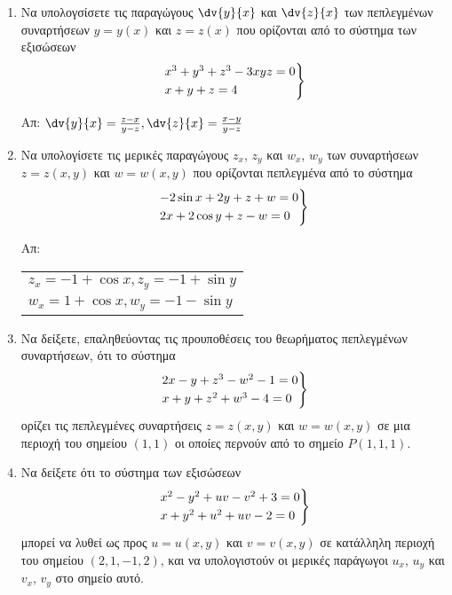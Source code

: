 \begin{enumerate}


    \item Να υπολογσίσετε τις παραγώγους $ \dv{y}{x} $ και $ \dv{z}{x}$ των πεπλεγμένων 
        συναρτήσεων $ y=y(x) $ και $ z=z(x) $ που ορίζονται από το σύστημα των εξισώσεων
        \[
            \begin{rcases}
                x^{3} + y^{3} + z^{3} -3xyz = 0 \\
                x+y+z=4 
            \end{rcases}
        \]

        \hfill Απ: $ \dv{y}{x} = \frac{ z-x }{ y-z }, \dv{z}{x} = \frac{ x-y }{ y-z } $ 

    \item Να υπολογίσετε τις μερικές παραγώγους $ z_{x}$, $ z_{y} $ και $ w_{x} $, 
        $ w_{y} $ των συναρτήσεων $ z = z(x,y) $ και $ w = w(x,y) $ που ορίζονται 
        πεπλεγμένα από το σύστημα 
        \[
            \begin{rcases}
                -2 \sin{x} + 2y + z + w = 0  \\
                2x + 2 \cos{y} + z - w = 0 
            \end{rcases} 
        \]

        \hfill Απ: \begin{tabular}{l}
            $ z_{x} = -1 + \cos{x}, z_{y} = -1 + \sin{y} $ \\
            $ w_{x} = 1 + \cos{x}, w_{y} = -1 - \sin{y}  $ 
        \end{tabular}

    \item Να δείξετε, επαληθεύοντας τις προυποθέσεις του θεωρήματος πεπλεγμένων
        συναρτήσεων, ότι το σύστημα 
        \[
            \begin{rcases}
                2x-y+z^{3}-w^{2}-1=0 \\
                x+y+z^{2}+w^{3}-4=0
            \end{rcases} 
        \]
        ορίζει τις πεπλεγμένες συναρτήσεις $ z = z(x,y) $ και $ w = w(x,y) $
        σε μια περιοχή του σημείου $ (1,1) $ οι οποίες περνούν από 
        το σημείο $ P(1,1,1) $.

    \item Να δείξετε ότι το σύστημα των εξισώσεων 
        \[
            \begin{rcases}
                x^{2}-y^{2}+uv-v^{2}+3 = 0 \\
                x+y^{2}+u^{2}+uv-2=0
            \end{rcases}
        \]
        μπορεί να λυθεί ως προς $ u = u(x,y) $ και $ v=v(x,y) $ σε κατάλληλη 
        περιοχή του σημείου $ (2,1,-1,2) $, και να υπολογιστούν οι μερικές παράγωγοι 
        $ u_{x} $, $ u_{y} $ και $ v_{x} $, $ v_{y} $ στο σημείο αυτό.


\end{enumerate}
